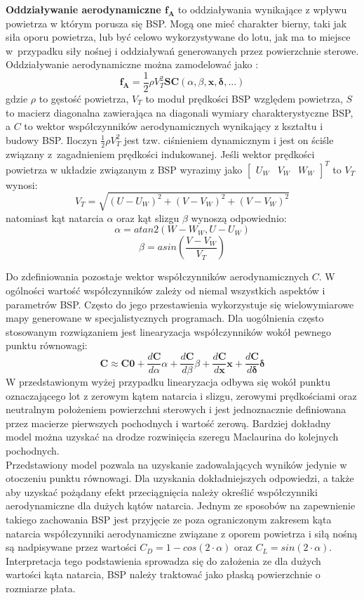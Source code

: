 \textbf{Oddziaływanie aerodynamiczne $\bm{f_A}$} to oddziaływania wynikające z wpływu powietrza w którym porusza się BSP. Mogą one mieć charakter bierny, taki jak siła oporu powietrza, lub być celowo wykorzystywane do lotu, jak ma to miejsce w~przypadku siły nośnej i oddziaływań generowanych przez powierzchnie sterowe. Oddziaływanie aerodynamiczne można zamodelować jako \cite{solar_plane}:
\[
	\bm{f_A} = \frac{1}{2}\rho V_{T}^2  \bm{S} \bm{C}\left(\alpha, \beta, \bm{x}, \bm{\delta}, ... \right)
\]
gdzie $\rho$ to gęstość powietrza, $V_T$ to moduł prędkości BSP względem powietrza, $S$ to macierz diagonalna zawierająca na diagonali wymiary charakterystyczne BSP, a $C$ to wektor współczynników aerodynamicznych wynikający z kształtu i budowy BSP. Iloczyn $\frac{1}{2}\rho V_{T}^2$ jest tzw. ciśnieniem dynamicznym i jest on ściśle związany z~zagadnieniem prędkości indukowanej. Jeśli wektor prędkości powietrza w układzie związanym z BSP wyrazimy jako $ \begin{bmatrix} U_W & V_W & W_W\end{bmatrix}^T$ to $V_T$ wynosi:
\[
	V_T = \sqrt{(U-U_W)^2 + (V-V_W)^2 + (V-V_W)^2}
\]
natomiast kąt natarcia $\alpha$ oraz kąt slizgu $\beta$ wynoszą odpowiednio:
\[
	\alpha = atan2 \left( W - W_W, U - U_W \right)
\]
\[
	\beta = asin \left( \frac{V-V_W}{V_T} \right)
\]

Do zdefiniowania pozostaje wektor współczynników aerodynamicznych $C$. W ogólności wartość współczynników zależy od niemal wszystkich aspektów i parametrów BSP. Często do jego przestawienia wykorzystuje się wielowymiarowe mapy generowane w specjalistycznych programach. Dla uogólnienia często stosowanym rozwiązaniem jest linearyzacja współczynników wokół pewnego punktu równowagi:
\[
\bm{C} \approx \bm{C0} + \frac{d\bm{C}}{d\alpha}\alpha + \frac{d\bm{C}}{d\beta}\beta + \frac{d\bm{C}}{d\bm{x}}\bm{x} + \frac{d\bm{C}}{d\bm{\delta}}\bm{\delta}
\]
W przedstawionym wyżej przypadku linearyzacja odbywa się wokół punktu oznaczającego lot z zerowym kątem natarcia i slizgu, zerowymi prędkościami oraz neutralnym położeniem powierzchni sterowych i jest jednoznacznie definiowana przez macierze pierwszych pochodnych i wartość zerową. Bardziej dokładny model można uzyskać na drodze rozwinięcia szeregu Maclaurina do kolejnych pochodnych.\\

Przedstawiony model pozwala na uzyskanie zadowalających wyników jedynie w otoczeniu punktu równowagi. Dla uzyskania dokładniejszych odpowiedzi, a także aby uzyskać pożądany efekt przeciągnięcia należy określić współczynniki aerodynamiczne dla dużych kątów natarcia. Jednym ze sposobów na zapewnienie takiego zachowania BSP jest przyjęcie ze poza ograniczonym zakresem kąta natarcia współczynniki aerodynamiczne związane z oporem powietrza i siłą nośną są nadpisywane przez wartości $C_D = 1 - cos(2 \cdot \alpha)$ oraz $C_L = sin(2 \cdot \alpha)$. Interpretacja tego podstawienia sprowadza się do założenia ze dla dużych wartości kąta natarcia, BSP należy traktować jako płaską powierzchnie o rozmiarze płata.\\


